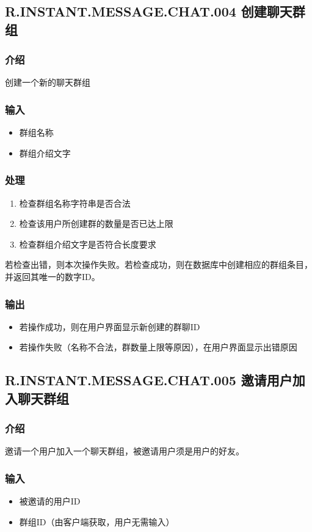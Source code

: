\subsection{R.INSTANT.MESSAGE.CHAT.004 创建聊天群组}
\subsubsection{介绍}
创建一个新的聊天群组
\subsubsection{输入}
\begin{itemize}
	\item 群组名称
	\item 群组介绍文字
\end{itemize}
\subsubsection{处理}
\begin{enumerate}
	\item 检查群组名称字符串是否合法
	\item 检查该用户所创建群的数量是否已达上限
	\item 检查群组介绍文字是否符合长度要求
\end{enumerate}
若检查出错，则本次操作失败。若检查成功，则在数据库中创建相应的群组条目，并返回其唯一的数字ID。
\subsubsection{输出}
\begin{itemize}
	\item 若操作成功，则在用户界面显示新创建的群聊ID
	\item 若操作失败（名称不合法，群数量上限等原因），在用户界面显示出错原因
\end{itemize}

\subsection{R.INSTANT.MESSAGE.CHAT.005 邀请用户加入聊天群组}
\subsubsection{介绍}
邀请一个用户加入一个聊天群组，被邀请用户须是用户的好友。
\subsubsection{输入}
\begin{itemize}
	\item 被邀请的用户ID
	\item 群组ID（由客户端获取，用户无需输入）
\end{itemize}
